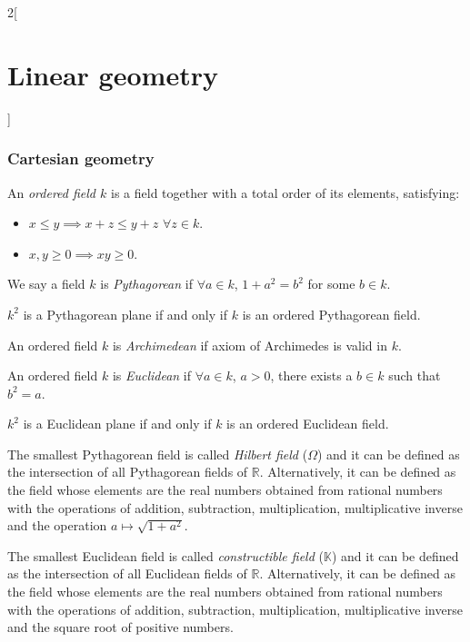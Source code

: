 \documentclass[../../../main.tex]{subfiles}
\begin{document}
\begin{multicols}{2}[\section{Linear geometry}]
\subsubsection*{Cartesian geometry}
\begin{definition}
An \textit{ordered field $k$} is a field together with a total order of its elements, satisfying:
\begin{itemize}
    \item $x\leq y\implies x+z\leq y+z$ $\forall z\in k$.
    \item $x,y\geq 0\implies xy\geq 0$.
\end{itemize}
\end{definition}
\begin{definition}
We say a field $k$ is \textit{Pythagorean} if $\forall a\in k$, $1+a^2=b^2$ for some $b\in k$.
\end{definition}
\begin{theorem}
$k^2$ is a Pythagorean plane if and only if $k$ is an ordered Pythagorean field.
\end{theorem}
\begin{definition}
An ordered field $k$ is \textit{Archimedean} if axiom of Archimedes is valid in $k$.
\end{definition}
\begin{definition}
An ordered field $k$ is \textit{Euclidean} if $\forall a\in k$, $a>0$, there exists a $b\in k$ such that $b^2=a$.
\end{definition}
\begin{theorem}
$k^2$ is a Euclidean plane if and only if $k$ is an ordered Euclidean field.
\end{theorem}
\begin{definition}
The smallest Pythagorean field is called \textit{Hilbert field} ($\Omega$) and it can be defined as the intersection of all Pythagorean fields of $\mathbb{R}$. Alternatively, it can be defined as the field whose elements are the real numbers obtained from rational numbers with the operations of addition, subtraction, multiplication, multiplicative inverse and the operation $a\mapsto\sqrt{1+a^2}$.
\end{definition}
\begin{definition}
The smallest Euclidean field is called \textit{constructible field} ($\mathbb{K}$) and it can be defined as the intersection of all Euclidean fields of $\mathbb{R}$. Alternatively, it can be defined as the field whose elements are the real numbers obtained from rational numbers with the operations of addition, subtraction, multiplication, multiplicative inverse and the square root of positive numbers.
\end{definition}

\end{multicols}
\end{document}
